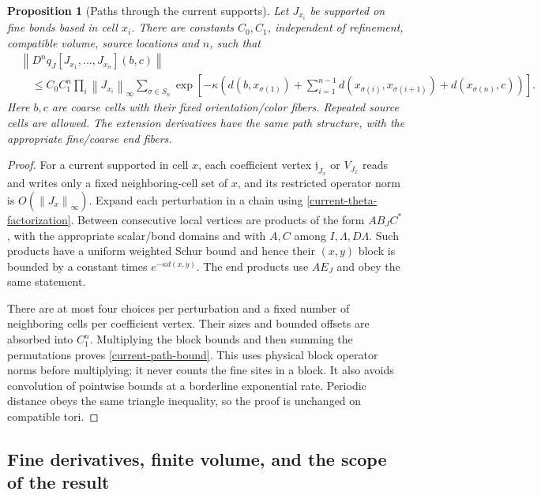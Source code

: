 \documentclass[11pt]{article}
\newtheorem{proposition}[theorem]{Proposition}
\theoremstyle{remark}
\newcommand{\norm}[1]{\left\|#1\right\|}
\begin{document}
\begin{proposition}[Paths through the current supports]
\label{current-localized-paths}
Let $J_{x_i}$ be supported on fine bonds based in cell $x_i$.
There are constants $C_0,C_1$, independent of refinement, compatible
volume, source locations and $n$, such that
\begin{equation}
 \begin{split}
 &\norm{D^nq_J[J_{x_1},\ldots,J_{x_n}](b,c)}\\
 &\quad\le C_0 C_1^n\prod_i\norm{J_{x_i}}_\infty
 \sum_{\sigma\in S_n}
 \exp\!\left[-\kappa\left(
 d(b,x_{\sigma(1)})
 +\sum_{i=1}^{n-1}d(x_{\sigma(i)},x_{\sigma(i+1)})
 +d(x_{\sigma(n)},c)\right)\right].
 \end{split}
 \label{current-path-bound}
\end{equation}
Here $b,c$ are coarse cells with their fixed orientation/color
fibers. Repeated source cells are allowed. The extension
derivatives have the same path structure, with the appropriate
fine/coarse end fibers.
\end{proposition}

\begin{proof}
For a current supported in cell $x$, each coefficient vertex
$\mathfrak j_{J_x}$ or $V_{J_x}$ reads and writes only a fixed
neighboring-cell set of $x$, and its restricted operator norm is
$O(\norm{J_x}_\infty)$. Expand each perturbation in a chain using
\eqref{current-theta-factorization}. Between consecutive local
vertices are products of the form $A B_J C^*$, with the appropriate
scalar/bond domains and with $A,C$ among
$I,\Lambda,D\Lambda$. Such products have a uniform weighted Schur
bound and hence their $(x,y)$ block is bounded by a constant times
$e^{-\kappa d(x,y)}$. The end products use $A E_J$ and obey the
same statement.

There are at most four choices per perturbation and a fixed number
of neighboring cells per coefficient vertex. Their sizes and
bounded offsets are absorbed into $C_1^n$. Multiplying the block
bounds and then summing the permutations proves
\eqref{current-path-bound}. This uses physical block operator norms
before multiplying; it never counts the fine sites in a block.
It also avoids convolution of pointwise bounds at a borderline
exponential rate. Periodic distance obeys the same triangle
inequality, so the proof is unchanged on compatible tori.
\end{proof}

\subsection{Fine derivatives, finite volume, and the scope of the result}
\label{current-scope-section}
\end{document}
